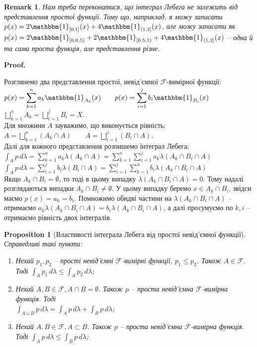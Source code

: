 \documentclass[a4paper, 10pt]{article}
\makeatletter
\theoremstyle{theoremdd}
\newtheorem{proposition}[theorem]{Proposition}
\newtheorem{remark}[theorem]{Remark}
\renewenvironment{proof}[1][Proof.\\]{\par
\pushQED{\hfill \qed}%
\normalfont \topsep6\p@\@plus6\p@\relax
\trivlist
\item\relax
{\bfseries
#1\@addpunct{.}}\hspace\labelsep\ignorespaces
}{%
\popQED\endtrivlist\@endpefalse
}
\makeatother
\begin{document}
\begin{remark}
Нам треба переконатися, що інтеграл Лебега не залежить від представлення простої функції. Тому що, наприклад, я можу записати $p(x) = 2 \mathbbm{1}_{[0,1]}(x) + 4 \mathbbm{1}_{(1,2]}(x)$, але можу записати як $p(x) = 2 \mathbbm{1}_{[0,0.5)} + 2 \mathbbm{1}_{[0.5,1)} + 4 \mathbbm{1}_{(1,2]}(x)$ -- одна й та сама проста функція, але представлення різне.
\end{remark}

\begin{proof}
Розглянемо два представлення простої, невід'ємної $\mathcal{F}$-вимірної функції:\\
$p(x) = \displaystyle\sum_{k=1}^n a_k \mathbbm{1}_{A_k}(x) \qquad p(x) = \displaystyle\sum_{i=1}^j b_i \mathbbm{1}_{B_i}(x)$ \hspace{3cm} $\displaystyle\bigsqcup_{k=1}^n A_k = \bigsqcup_{i=1}^j B_i = X$.\\
Для множини $A$ зауважимо, що виконується рівність:\\
$A = \displaystyle\bigsqcup_{k=1}^n (A_k \cap A) \qquad A = \bigsqcup_{i=1}^j (B_i \cap A)$.\\
Далі для кожного представлення розпишемо інтеграл Лебега:\\
$\displaystyle\int_A p\,d\lambda = \sum_{k=1}^n a_k \lambda(A_k \cap A) = \sum_{k=1}^n \sum_{i=1}^j a_k \lambda(A_k \cap B_i \cap A)$\\
$\displaystyle\int_A p\,d\lambda = \sum_{i=1}^j b_i \lambda(B_i \cap A) = \sum_{i=1}^j \sum_{k=1}^n b_i \lambda(A_k \cap B_i \cap A)$\\
Якщо $A_k \cap B_i = \emptyset$, то тоді в цьому випадку $\lambda(A_k \cap B_i \cap A) = 0$. Тому надалі розглядаються випадки $A_k \cap B_i \neq \emptyset$. У цьому випадку беремо $x \in A_k \cap B_i$, звідси маємо $p(x) = a_k = b_i$. Помножимо обидві частини на $\lambda(A_k \cap B_i \cap A)$ -- отримаємо $a_k \lambda(A_k \cap B_i \cap A) = b_i \lambda(A_k \cap B_i \cap A)$, а далі просумуємо по $k,i$ -- отримаємо рівність двох інтегралів.
\end{proof}

\begin{proposition}[Властивості інтеграла Лебега від простої невід'ємної функції]
Справедливі такі пункти:
\begin{enumerate}[nosep,wide=0pt,label={\arabic*)}]
\item Нехай $p_1,p_2$ -- прості невід'ємні $\mathcal{F}$-вимірні функції, $p_1 \! \leq p_2$. Також $A \!\in \mathcal{F}$. Тоді $\displaystyle\int_A p_1\,d\lambda \leq \int_A p_2\,d\lambda$;
\item Нехай $A,B \in \mathcal{F}, A \cap B = \emptyset$. Також $p$ -- проста невід'ємна $\mathcal{F}$-вимірна функція. Тоді \\ $\displaystyle\int_{A \sqcup B} p\,d\lambda = \int_A p\,d\lambda + \int_B p\,d\lambda$;
\item Нехай $A,B \in \mathcal{F}, A \subset B$. Також $p$ -- проста невід'ємна $\mathcal{F}$-вимірна функція. Тоді $\displaystyle\int_A p\,d\lambda \leq \int_B p\,d\lambda$;
\end{enumerate}
\end{proposition}
\end{document}
